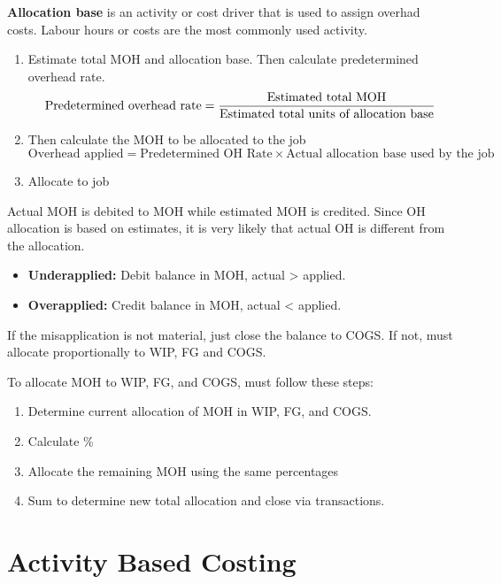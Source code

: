 \documentclass[english, 12pt]{article}
\begin{document}
\begin{mthd}
\textbf{Allocation base} is an activity or cost driver that is used to assign overhad costs. Labour hours or costs are the most commonly used activity.
\begin{enumerate}
\item Estimate total MOH and allocation base. Then calculate predetermined overhead rate.
\[\text{Predetermined overhead rate} = \frac{\text{Estimated total MOH}}{\text{Estimated total units of allocation base}}\]
\item Then calculate the MOH to be allocated to the job
\[ \text{Overhead applied} = \text{Predetermined OH Rate} \times \text{Actual allocation base used by the job}\]
\item Allocate to job
\end{enumerate}
\end{mthd}

\begin{note}
Actual MOH is debited to MOH while estimated MOH is credited. Since OH allocation is based on estimates, it is very likely that actual OH is different from the allocation.
\begin{itemize}
\item \textbf{Underapplied:} Debit balance in MOH, actual > applied.
\item \textbf{Overapplied:} Credit balance in MOH, actual < applied.
\end{itemize}
If the misapplication is not material, just close the balance to COGS. If not, must allocate proportionally to WIP, FG and COGS.
\end{note}

\begin{mthd}
To allocate MOH to WIP, FG, and COGS, must follow these steps:
\begin{enumerate}
\item Determine current allocation of MOH in WIP, FG, and COGS.
\item Calculate \%
\item Allocate the remaining MOH using the same percentages
\item Sum to determine new total allocation and close via transactions.
\end{enumerate}
\end{mthd}

\section{Activity Based Costing}
\end{document}
